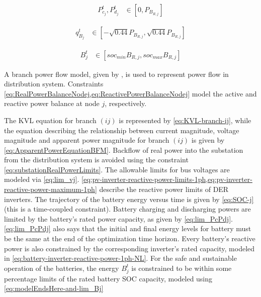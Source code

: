 \documentclass[../../outputs/main.tex]{subfiles}
\begin{document}
\vspace{-1.5em} %

\begin{align}
    { P^{t}_{c_{j}}, P^{t}_{d_{j}} }
    &\in
    { \left[ 0, P_{B_{R, j}} \right]}\label{eq:lim_PcPdj}
\end{align}

\vspace{-1.5em} %

\begin{align}
    { q^{t}_{B_{j}} } 
    &\in 
    { \left[-\sqrt{0.44}P_{B_{R, j}}, \sqrt{0.44}P_{B_{R, j}}\right] } \label{eq:battery-inverter-reactive-power-1ph-NL}
\end{align}

\vspace{-1.5em} %

\begin{align}
    { B^{t}_{j} } &\in { \left[ soc_{min}B_{R, j}, soc_{max}B_{R, j} \right] } \label{eq:modelEndsHere-and-lim_Bj}
\end{align}

A branch power flow model, given by , is used to represent power flow in distribution system.   Constraints \cref{eq:RealPowerBalanceNodej,eq:ReactivePowerBalanceNodej} model the active and reactive power balance at node $j$, respectively.

The KVL equation for branch $(ij)$ is represented by \cref{eq:KVL-branch-ij}, while the equation describing the relationship between current magnitude, voltage magnitude and apparent power magnitude for branch $(ij)$ is given by \cref{eq:ApparentPowerEquationBFM}. Backflow of real power into the substation from the distribution system is avoided using the constraint \cref{eq:substationRealPowerLimits}. The allowable limits for bus voltages are modeled via \cref{eq:lim_vj}. \cref{eq:pv-inverter-reactive-power-limits-1ph,eq:pv-inverter-reactive-power-maximum-1ph} describe the reactive power limits of DER inverters. The trajectory of the battery energy versus time is given by \cref{eq:SOC-j} (this is a time-coupled constraint). Battery charging and discharging powers are limited by the battery's rated power capacity, as given by \cref{eq:lim_PcPdj}. \cref{eq:lim_PcPdj} also says that the initial and final energy levels for battery must be the same at the end of the optimization time horizon. Every battery's reactive power is also constrained by the corresponding inverter's rated capacity, modeled in \cref{eq:battery-inverter-reactive-power-1ph-NL}. For the safe and sustainable operation of the batteries, the energy $B^{t}_{j}$ is constrained to be within some percentage limits of the rated battery SOC capacity, modeled using \cref{eq:modelEndsHere-and-lim_Bj}
\end{document}
